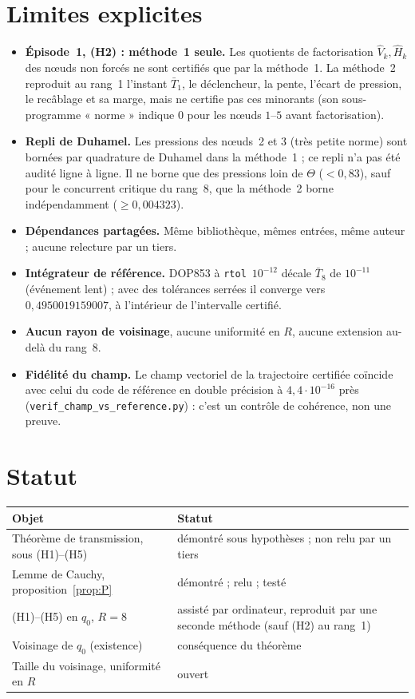 \documentclass[11pt,a4paper]{article}
\theoremstyle{remark}
\begin{document}
\section{Limites explicites}\label{sec:limites}
\begin{itemize}[nosep]
\item \textbf{Épisode~1, (H2) : méthode~1 seule.} Les quotients de factorisation $\hat V_k,\hat H_k$ des nœuds non forcés ne sont certifiés que par la méthode~1. La méthode~2 reproduit au rang~1 l'instant $\bar T_1$, le déclencheur, la pente, l'écart de pression, le recâblage et sa marge, mais ne certifie pas ces minorants (son sous-programme « norme » indique $0$ pour les nœuds $1$--$5$ avant factorisation).
\item \textbf{Repli de Duhamel.} Les pressions des nœuds~2 et 3 (très petite norme) sont bornées par quadrature de Duhamel dans la méthode~1 ; ce repli n'a pas été audité ligne à ligne. Il ne borne que des pressions loin de $\Theta$ ($<0{,}83$), sauf pour le concurrent critique du rang~8, que la méthode~2 borne indépendamment ($\ge0{,}004323$).
\item \textbf{Dépendances partagées.} Même bibliothèque, mêmes entrées, même auteur ; aucune relecture par un tiers.
\item \textbf{Intégrateur de référence.} DOP853 à \texttt{rtol}~$10^{-12}$ décale $\bar T_8$ de $10^{-11}$ (événement lent) ; avec des tolérances serrées il converge vers $0{,}4950019159007$, à l'intérieur de l'intervalle certifié.
\item \textbf{Aucun rayon de voisinage}, aucune uniformité en $R$, aucune extension au-delà du rang~8.
\item \textbf{Fidélité du champ.} Le champ vectoriel de la trajectoire certifiée coïncide avec celui du code de référence en double précision à $4{,}4\cdot10^{-16}$ près (\texttt{verif\_champ\_vs\_reference.py}) : c'est un contrôle de cohérence, non une preuve.
\end{itemize}

\section{Statut}
\begin{center}
\begin{tabular}{p{}p{}}
\toprule
Objet & Statut\\
\midrule
Théorème de transmission, sous (H1)--(H5) & démontré sous hypothèses ; non relu par un tiers\\
Lemme de Cauchy, proposition~\ref{prop:P} & démontré ; relu ; testé\\
(H1)--(H5) en $q_0$, $R=8$ & assisté par ordinateur, reproduit par une seconde méthode (sauf (H2) au rang~1)\\
Voisinage de $q_0$ (existence) & conséquence du théorème\\
Taille du voisinage, uniformité en $R$ & ouvert\\
\bottomrule
\end{tabular}
\end{center}
\end{document}
